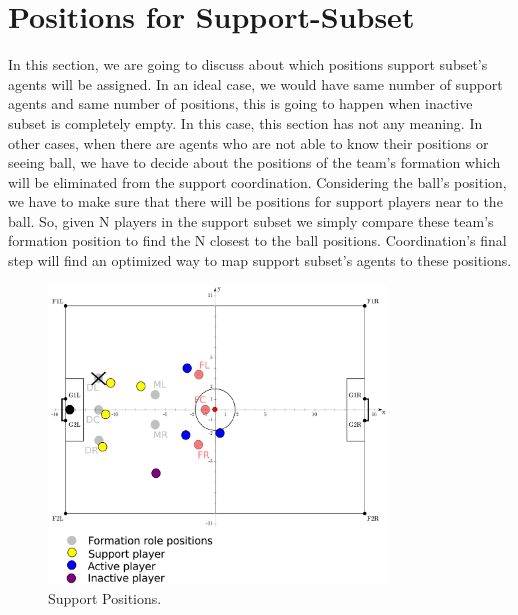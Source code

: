 \section{Positions for Support-Subset}
In this section, we are going to discuss about which positions support subset's agents will be assigned. In an ideal case, we would have same number of support agents and same number of positions, this is going to happen when inactive subset is completely empty. In this case, this section has not any meaning. In other cases, when there are agents who are not able to know their positions or seeing ball, we have to decide about the positions of the team's formation which will be eliminated from the support coordination. Considering the ball's position, we have to make sure that there will be positions for support players near to the ball. So, given N players in the support subset we simply compare these team's formation position to find the N closest to the ball positions. Coordination's final step will find an optimized way to map support subset's agents to these positions.
\begin{figure}[htb!]
\centering
  \includegraphics[width=0.8\textwidth]{Chapter4/figures/SupportPos.pdf}
  \caption{Support Positions.} 
  \label{fig:SupportPos}
\end{figure}

